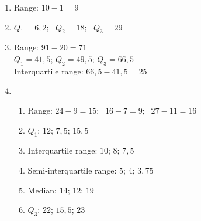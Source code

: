  \begin{solutions}{}{
\begin{enumerate}[itemsep=5pt, label=\textbf{\arabic*}. ] 
\item Range: $10-1=9$
\item $Q_1 = 6,2$;~ $ Q_2 = 18$;~ $Q_3 = 29$
\item Range: $91-20=71$\\
 $Q_1 = 41,5$; $Q_2 = 49,5$; $Q_3 = 66,5$ \\
 Interquartile range: $66,5-41,5=25$
\item 
\begin{enumerate}[noitemsep, label=\textbf{(\alph*)} ]
    \item Range: $24-9=15$; $~~16-7=9$; $~~27-11=16$
    \item $Q_1$: $12$;  $7,5$; $15,5$ 
    \item Interquartile range: $10$; $8$; $7,5$
    \item Semi-interquartile range: $5$; $4$; $3,75$
    \item Median: $14$; $12$; $19$
    \item $Q_3$: $22$; $15,5$; $23$
\end{enumerate}

\end{enumerate}}
\end{solutions}

